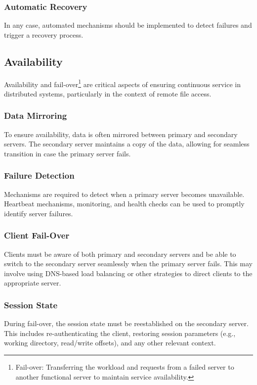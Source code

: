 \documentclass{report}
\begin{document}
\subsubsection{Automatic Recovery}
In any case, automated mechanisms should be implemented to detect failures and trigger a recovery process.


\subsection{Availability}
Availability and fail-over\footnote{Fail-over: Transferring the workload and requests from a failed
  server to another functional server to maintain service availability.} are critical aspects of
ensuring continuous service in distributed systems, particularly in the context of remote file
access.


\subsubsection{Data Mirroring}
To ensure availability, data is often mirrored between primary and secondary servers. The secondary
server maintains a copy of the data, allowing for seamless transition in case the primary server
fails.


\subsubsection{Failure Detection}
Mechanisms are required to detect when a primary server becomes unavailable. Heartbeat mechanisms,
monitoring, and health checks can be used to promptly identify server failures.


\subsubsection{Client Fail-Over}
Clients must be aware of both primary and secondary servers and be able to switch to the secondary
server seamlessly when the primary server fails. This may involve using DNS-based load balancing or
other strategies to direct clients to the appropriate server. 


\subsubsection{Session State}
During fail-over, the session state must be reestablished on the secondary server. This includes
re-authenticating the client, restoring session parameters (e.g., working directory, read/write
offsets), and any other relevant context. 
\end{document}
